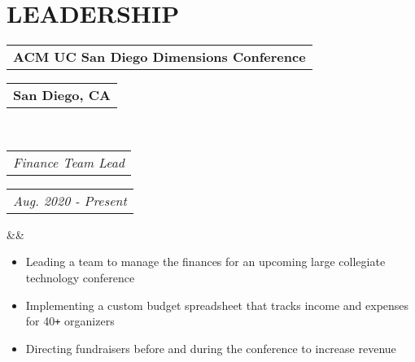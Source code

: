 \documentclass[11pt,letterpaper,sans]{moderncv}        %
\makeatletter
\newcommand*{\customcventry}[7][.25em]{
  \begin{tabular}{@{}l} 
    {\bfseries #4}
  \end{tabular}
  \hfill%
  \begin{tabular}{l@{}}
     {\bfseries #5}
  \end{tabular} \\
  \begin{tabular}{@{}l} 
    {\itshape #3}
  \end{tabular}
  \hfill%
  \begin{tabular}{l@{}}
     {\itshape #2}
  \end{tabular}
  \ifx&#7&%
  \else{\\%
    \begin{minipage}{\maincolumnwidth}%
      #7%
    \end{minipage}}\fi%
  \par\addvspace{#1}}
\makeatother
\begin{document}
\vspace*{-4mm}

\section{LEADERSHIP}
\customcventry{Aug. 2020 - Present}{Finance Team Lead}{ACM UC San Diego Dimensions Conference}{San Diego, CA}{e}{}
\begin{itemize}
    \item Leading a team to manage the finances for an upcoming large collegiate technology conference
    \item Implementing a custom budget spreadsheet that tracks income and expenses for 40{}\verb!+! organizers
    \item Directing fundraisers before and during the conference to increase revenue
\end{itemize}

\nocite{*}



\end{document}
